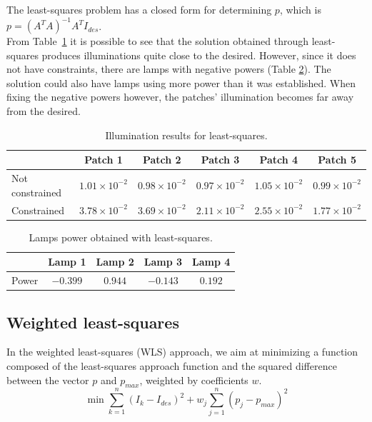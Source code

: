 \documentclass[11pt,a4paper]{article}
\begin{document}
The least-squares problem has a closed form for determining $p$, which is $p = (A^T A)^{-1} A^T I_{des}$.\\

From Table~\ref{tab:least-squares} it is possible to see that the solution obtained through least-squares produces illuminations quite close to the desired. However, since it does not have constraints, there are lamps with negative powers (Table \ref{tab:least-squares-power}). The solution could also have lamps using more power than it was established. 
When fixing the negative powers however, the patches' illumination becomes far away from the desired.

\begin{table}[!htb]
    \centering
    \caption{Illumination results for least-squares.}
    \begin{tabular}{lccccc}
        \hline
        & Patch 1 & Patch 2 & Patch 3 & Patch 4 & Patch 5\\
        \hline
        Not constrained & $1.01\times10^{-2}$ & $0.98\times10^{-2}$ & $0.97\times10^{-2}$ & $1.05\times10^{-2}$ & $0.99\times10^{-2}$\\
        Constrained & $3.78\times10^{-2}$ & $3.69\times10^{-2}$ & $2.11\times10^{-2}$ & $2.55\times10^{-2}$ & $1.77\times10^{-2}$\\
        \hline
    \end{tabular}\label{tab:least-squares}
\end{table}

\begin{table}[!htb]
    \centering
    \caption{Lamps power obtained with least-squares.}
    \begin{tabular}{lcccc}
        \hline
        & Lamp 1 & Lamp 2 & Lamp 3 & Lamp 4\\
        \hline
        Power & $-0.399$ & $0.944$ & $-0.143$ & $0.192$\\
        \hline
    \end{tabular}\label{tab:least-squares-power}
\end{table}

\subsection{Weighted least-squares}

In the weighted least-squares (WLS) approach, we aim at minimizing a function composed of the least-squares approach function and the squared difference between the vector $p$ and $p_{max}$, weighted by coefficients $w$. 
\begin{equation*}
    \min \displaystyle \sum_{k=1}^{n}(I_k - I_{des})^2 + w_j\sum_{j=1}^n (p_j - p_{max})^2
\end{equation*}
\end{document}
